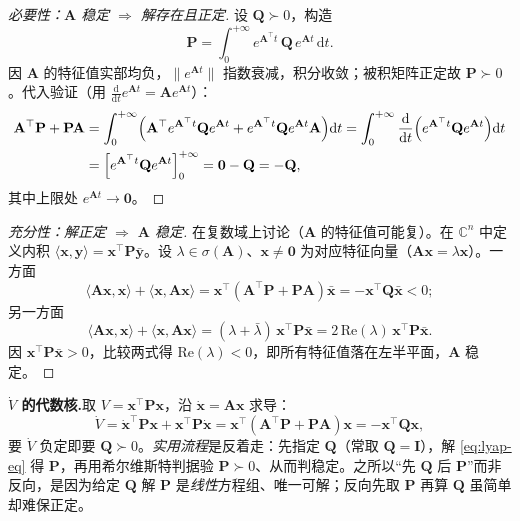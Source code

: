 \begin{proof}[必要性：$\mathbf{A}$ 稳定 $\Rightarrow$ 解存在且正定]
设 $\mathbf{Q}\succ0$，构造
\begin{equation}
  \mathbf{P}=\int_0^{+\infty}e^{\mathbf{A}^\top t}\,\mathbf{Q}\,e^{\mathbf{A}t}\,\mathrm dt.
  \label{eq:lyap-P-int}
\end{equation}
因 $\mathbf{A}$ 的特征值实部均负，$\|e^{\mathbf{A}t}\|$ 指数衰减，积分收敛；被积矩阵正定故 $\mathbf{P}\succ0$。代入验证（用 $\frac{\mathrm d}{\mathrm dt}e^{\mathbf{A}t}=\mathbf{A}e^{\mathbf{A}t}$）：
\begin{align}
  \mathbf{A}^\top\mathbf{P}+\mathbf{P}\mathbf{A}
  &=\int_0^{+\infty}\!\Big(\mathbf{A}^\top e^{\mathbf{A}^\top t}\mathbf{Q}e^{\mathbf{A}t}+e^{\mathbf{A}^\top t}\mathbf{Q}e^{\mathbf{A}t}\mathbf{A}\Big)\mathrm dt
   =\int_0^{+\infty}\frac{\mathrm d}{\mathrm dt}\Big(e^{\mathbf{A}^\top t}\mathbf{Q}e^{\mathbf{A}t}\Big)\mathrm dt\notag\\
  &=\Big[e^{\mathbf{A}^\top t}\mathbf{Q}e^{\mathbf{A}t}\Big]_0^{+\infty}=\mathbf{0}-\mathbf{Q}=-\mathbf{Q},
\end{align}
其中上限处 $e^{\mathbf{A}t}\to\mathbf{0}$。
\end{proof}

\begin{proof}[充分性：解正定 $\Rightarrow$ $\mathbf{A}$ 稳定]
在复数域上讨论（$\mathbf{A}$ 的特征值可能复）。在 $\mathbb{C}^n$ 中定义内积 $\langle\mathbf{x},\mathbf{y}\rangle=\mathbf{x}^\top\mathbf{P}\bar{\mathbf{y}}$。设 $\lambda\in\sigma(\mathbf{A})$、$\mathbf{x}\neq\mathbf{0}$ 为对应特征向量（$\mathbf{A}\mathbf{x}=\lambda\mathbf{x}$）。一方面
\[
  \langle\mathbf{A}\mathbf{x},\mathbf{x}\rangle+\langle\mathbf{x},\mathbf{A}\mathbf{x}\rangle
  =\mathbf{x}^\top(\mathbf{A}^\top\mathbf{P}+\mathbf{P}\mathbf{A})\bar{\mathbf{x}}=-\mathbf{x}^\top\mathbf{Q}\bar{\mathbf{x}}<0;
\]
另一方面
\[
  \langle\mathbf{A}\mathbf{x},\mathbf{x}\rangle+\langle\mathbf{x},\mathbf{A}\mathbf{x}\rangle
  =(\lambda+\bar\lambda)\,\mathbf{x}^\top\mathbf{P}\bar{\mathbf{x}}=2\,\mathrm{Re}(\lambda)\,\mathbf{x}^\top\mathbf{P}\bar{\mathbf{x}}.
\]
因 $\mathbf{x}^\top\mathbf{P}\bar{\mathbf{x}}>0$，比较两式得 $\mathrm{Re}(\lambda)<0$，即所有特征值落在左半平面，$\mathbf{A}$ 稳定。
\end{proof}

\noindent\textbf{$\dot V$ 的代数核.}\;取 $V=\mathbf{x}^\top\mathbf{P}\mathbf{x}$，沿 $\dot{\mathbf{x}}=\mathbf{A}\mathbf{x}$ 求导：
\begin{equation}
  \dot V=\dot{\mathbf{x}}^\top\mathbf{P}\mathbf{x}+\mathbf{x}^\top\mathbf{P}\dot{\mathbf{x}}
  =\mathbf{x}^\top(\mathbf{A}^\top\mathbf{P}+\mathbf{P}\mathbf{A})\mathbf{x}=-\mathbf{x}^\top\mathbf{Q}\mathbf{x},
  \label{eq:Vdot-core}
\end{equation}
要 $\dot V$ 负定即要 $\mathbf{Q}\succ0$。\emph{实用流程}是反着走：先指定 $\mathbf{Q}$（常取 $\mathbf{Q}=\mathbf{I}$），解 \cref{eq:lyap-eq} 得 $\mathbf{P}$，再用希尔维斯特判据验 $\mathbf{P}\succ0$、从而判稳定。之所以“先 $\mathbf{Q}$ 后 $\mathbf{P}$”而非反向，是因为给定 $\mathbf{Q}$ 解 $\mathbf{P}$ 是\emph{线性}方程组、唯一可解；反向先取 $\mathbf{P}$ 再算 $\mathbf{Q}$ 虽简单却难保正定。

